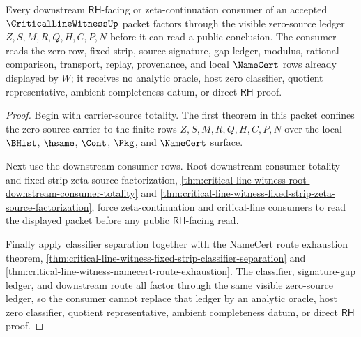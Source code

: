 \begin{theorem}
\label{thm:critical-line-witness-zero-source-ledger-exhaustion}
Every downstream $\mathsf{RH}$-facing or zeta-continuation consumer of an accepted $\CriticalLineWitnessUp$ packet factors through the visible zero-source ledger $Z,S,M,R,Q,H,C,P,N$ before it can read a public conclusion. The consumer reads the zero row, fixed strip, source signature, gap ledger, modulus, rational comparison, transport, replay, provenance, and local $\NameCert$ rows already displayed by $W$; it receives no analytic oracle, host zero classifier, quotient representative, ambient completeness datum, or direct $\mathsf{RH}$ proof.
\end{theorem}
\begin{proof}
Begin with carrier-source totality. The first theorem in this packet confines the zero-source carrier to the finite rows $Z,S,M,R,Q,H,C,P,N$ over the local $\BHist$, $\hsame$, $\Cont$, $\Pkg$, and $\NameCert$ surface.

Next use the downstream consumer rows. Root downstream consumer totality and fixed-strip zeta source factorization, \autoref{thm:critical-line-witness-root-downstream-consumer-totality} and \autoref{thm:critical-line-witness-fixed-strip-zeta-source-factorization}, force zeta-continuation and critical-line consumers to read the displayed packet before any public $\mathsf{RH}$-facing read.

Finally apply classifier separation together with the NameCert route exhaustion theorem, \autoref{thm:critical-line-witness-fixed-strip-classifier-separation} and \autoref{thm:critical-line-witness-namecert-route-exhaustion}. The classifier, signature-gap ledger, and downstream route all factor through the same visible zero-source ledger, so the consumer cannot replace that ledger by an analytic oracle, host zero classifier, quotient representative, ambient completeness datum, or direct $\mathsf{RH}$ proof.
\end{proof}

